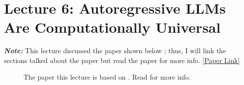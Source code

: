 \documentclass[12pt, twoside]{article}
\begin{document}
\newpage


\thispagestyle{RemoveHeader}


\section*{\normalsize Lecture 6: Autoregressive LLMs Are Computationally Universal}

\textit{\textbf{Note:}} This lecture discussed the paper shown below \cite{schuurmans2024autoregressive}; thus, I will link the sections talked about the paper but read the paper for more info. \href{https://arxiv.org/abs/2410.03170}{[Paper Link]}

\begin{figure}[h]
    \centering
    \caption{The paper this lecture is based on \cite{schuurmans2024autoregressive}. Read for more info.}
    \label{fig: 2.1.1}
\end{figure}
\end{document}

